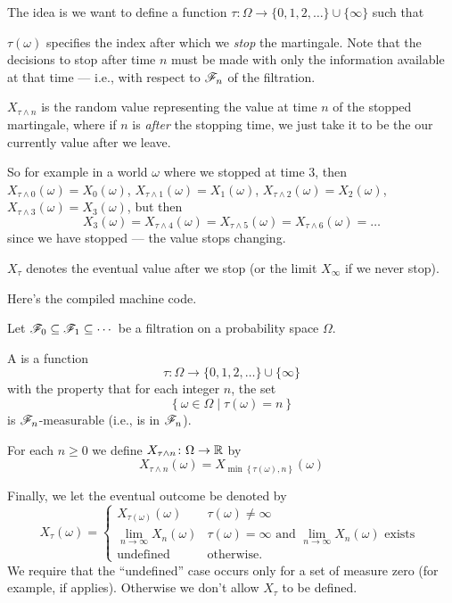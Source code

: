 The idea is we want to define a function
$\tau \colon \Omega \to \{0, 1, 2, \dots\} \cup \{\infty\}$ such that
\begin{itemize}
	\ii $\tau(\omega)$ specifies the index
	after which we \emph{stop} the martingale.
	Note that the decisions to stop after time $n$
	must be made with only the information available at that time ---
	i.e., with respect to $\mathscr F_n$ of the filtration.

	\ii $X_{\tau \wedge n}$ is the random value representing the
	value at time $n$ of the stopped martingale,
	where if $n$ is \emph{after} the stopping time,
	we just take it to be the our currently value after we leave.

	So for example in a world $\omega$ where we stopped at time $3$, then
	$X_{\tau \wedge 0}(\omega) = X_0(\omega)$,
	$X_{\tau \wedge 1}(\omega) = X_1(\omega)$,
	$X_{\tau \wedge 2}(\omega) = X_2(\omega)$,
	$X_{\tau \wedge 3}(\omega) = X_3(\omega)$, but then
	\[ X_3(\omega)
		= X_{\tau \wedge 4}(\omega)
		= X_{\tau \wedge 5}(\omega)
		= X_{\tau \wedge 6}(\omega)
		= \dots
	\]
	since we have stopped --- the value stops changing.

	\ii $X_{\tau}$ denotes the eventual value after we stop
	(or the limit $X_\infty$ if we never stop).
\end{itemize}

Here's the compiled machine code.
\begin{definition}
	Let $\mathscr F_0 \subseteq \mathscr F_1 \subseteq \cdots$ be a filtration
	on a probability space $\Omega$.
	\begin{itemize}
		\ii A  is a function
		\[ \tau \colon \Omega \to \{0, 1, 2, \dots\} \cup \{\infty\} \]
		with the property that for each integer $n$, the set
		\[ \left\{ \omega \in \Omega \mid \tau(\omega) = n \right\} \]
		is $\mathscr F_n$-measurable (i.e., is in $\mathscr F_n$).

		\ii For each $n \ge 0$ we define
		$X_{\tau \wedge n} \colon \Omega \to \mathbb R$ by
		\[ X_{\tau \wedge n}(\omega)
		= X_{\min \left\{ \tau(\omega), n \right\}}(\omega) \]

		\ii Finally, we let the eventual outcome be denoted by
		\[ X_\tau(\omega)
			= \begin{cases}
				X_{\tau(\omega)}(\omega) & \tau(\omega) \neq \infty \\
				\lim_{n \to \infty} X_n(\omega) & \tau(\omega) = \infty
				\text{ and } \lim_{n \to \infty} X_n(\omega) \text{ exists } \\
				\text{undefined} & \text{otherwise}.
			\end{cases}
		\]
		We require that the ``undefined'' case occurs
		only for a set of measure zero
		(for example, if  applies).
		Otherwise we don't allow $X_\tau$ to be defined.
	\end{itemize}
\end{definition}


